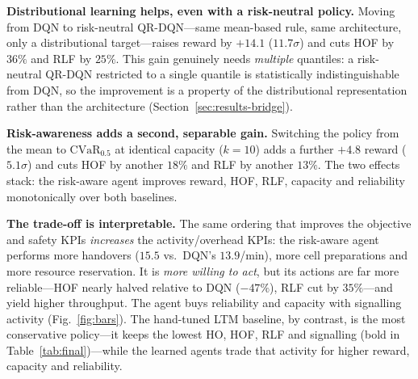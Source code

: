 \documentclass[conference]{IEEEtran}
\begin{document}
\textbf{Distributional learning helps, even with a risk-neutral policy.}
Moving from DQN to risk-neutral QR-DQN---same mean-based rule, same
architecture, only a distributional target---raises reward by $+14.1$
($11.7\sigma$) and cuts HOF by $36\%$ and RLF by $25\%$. This gain genuinely
needs \emph{multiple} quantiles: a risk-neutral QR-DQN restricted to a single
quantile is statistically indistinguishable from DQN, so the improvement is a
property of the distributional representation rather than the architecture
(Section~\ref{sec:results-bridge}).

\textbf{Risk-awareness adds a second, separable gain.} Switching the policy
from the mean to $\mathrm{CVaR}_{0.5}$ at identical capacity ($k=10$) adds a
further $+4.8$ reward ($5.1\sigma$) and cuts HOF by another $18\%$ and RLF by
another $13\%$. The two effects stack: the risk-aware agent improves reward,
HOF, RLF, capacity and reliability monotonically over both baselines.

\textbf{The trade-off is interpretable.} The same ordering that improves the
objective and safety KPIs \emph{increases} the activity/overhead KPIs: the
risk-aware agent performs more handovers ($15.5$ vs.\ DQN's $13.9$/min), more
cell preparations and more resource reservation. It is \emph{more willing to
act}, but its actions are far more reliable---HOF nearly halved relative to DQN
($-47\%$), RLF cut by $35\%$---and yield higher throughput. The agent buys
reliability and capacity with signalling activity (Fig.~\ref{fig:bars}). The
hand-tuned LTM baseline, by contrast, is the most conservative policy---it keeps
the lowest HO, HOF, RLF and signalling (bold in Table~\ref{tab:final})---while
the learned agents trade that activity for higher reward, capacity and
reliability.
\end{document}
